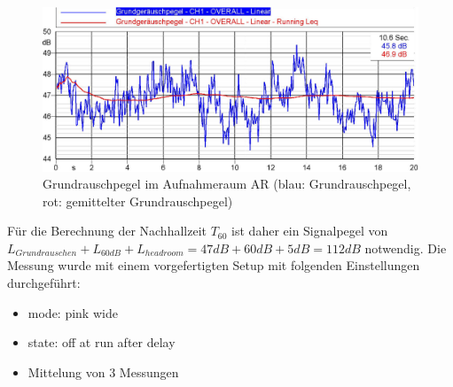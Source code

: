 \documentclass[11pt]{report}
\begin{document}
\begin{figure}[htbp]
\begin{center}
\includegraphics[width=14cm,keepaspectratio=true]{Grundrauschpegel}
\caption{Grundrauschpegel im Aufnahmeraum AR (blau: Grundrauschpegel, rot: gemittelter Grundrauschpegel)}
\label{fig:grundrauschpegel}
\end{center}
\end{figure}
Für die Berechnung der Nachhallzeit $T_{60}$ ist daher ein Signalpegel von $L_{Grundrauschen}+L_{60dB}+L_{headroom}=47dB+60dB+5dB=112dB$ notwendig. Die Messung wurde mit einem vorgefertigten Setup mit folgenden Einstellungen durchgeführt:
\begin{itemize}
\item mode: pink wide
\item state: off at run after delay
\item Mittelung von 3 Messungen
\end{itemize}
\end{document}

